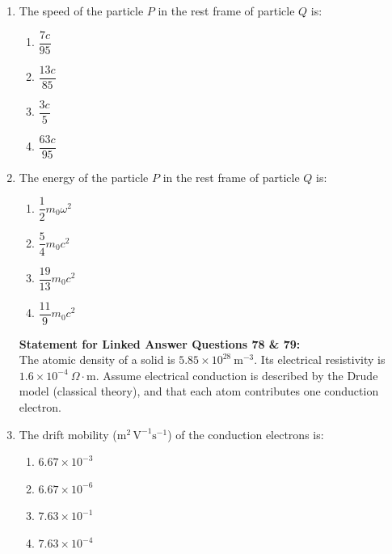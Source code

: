 \documentclass[journal,12pt,onecolumn]{IEEEtran}
\begin{document}
\begin{enumerate}[itemsep = 1em]
\item The speed of the particle $P$ in the rest frame of particle $Q$ is:

\hfill{}

\begin{multicols}{4}
\begin{enumerate}
    \item $\dfrac{7c}{95}$
    \item $\dfrac{13c}{85}$
    \item $\dfrac{3c}{5}$
    \item $\dfrac{63c}{95}$
\end{enumerate}
\end{multicols}

\item The energy of the particle $P$ in the rest frame of particle $Q$ is:

\hfill{}

\begin{multicols}{4}
\begin{enumerate}
    \item $\dfrac{1}{2} m_0 \omega^2$
    \item $\dfrac{5}{4} m_0 c^2$
    \item $\dfrac{19}{13} m_0 c^2$
    \item $\dfrac{11}{9} m_0 c^2$
\end{enumerate}
\end{multicols}


\vspace{2em}


\textbf{Statement for Linked Answer Questions 78 \& 79:} \\
The atomic density of a solid is $5.85 \times 10^{28} \ \mathrm{m}^{-3}$. Its electrical resistivity is $1.6 \times 10^{-4} \ \Omega\cdot\mathrm{m}$. Assume electrical conduction is described by the Drude model (classical theory), and that each atom contributes one conduction electron.

\item The drift mobility ($\mathrm{m^2 \, V^{-1} s^{-1}}$) of the conduction electrons is:

\hfill{}

\begin{multicols}{4}
\begin{enumerate}
    \item $6.67 \times 10^{-3}$
    \item $6.67 \times 10^{-6}$
    \item $7.63 \times 10^{-1}$
    \item $7.63 \times 10^{-4}$
\end{enumerate}
\end{multicols}


\end{enumerate}
\end{document}
